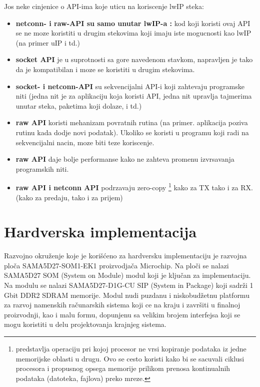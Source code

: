 \documentclass[a4paper,12pt, master]{etf}
\begin{document}
	Jos neke cinjenice o API-ima koje uticu na koriscenje lwIP steka:
	\begin{itemize}
		\item \textbf{netconn- i raw-API su samo unutar lwIP-a :} kod koji koristi ovaj API se 
		ne moze koristiti u drugim stekovima koji imaju iste mogucnosti kao lwIP (na primer 
		uIP i td.)
		\item \textbf{socket API} je u suprotnosti sa gore navedenom stavkom, napravljen je 
		tako da je kompatibilan i moze se koristiti u drugim stekovima.
		\item \textbf{socket- i netconn-API} su sekvencijalni API-i koji zahtevaju programske 
		niti (jedna nit je za aplikaciju koja koristi API, jedna nit upravlja tajmerima unutar 
		steka, paketima koji dolaze, i td.)
		\item \textbf{raw API} koristi mehanizam povratnih rutina (na primer. aplikacija poziva
		rutinu kada dodje novi podatak). Ukoliko se koristi u programu koji radi na 
		sekvencijalni nacin, moze biti teze koriscenje.
		\item \textbf{raw API} daje bolje performanse kako ne zahteva promenu izvrsavanja
		programskih niti.
		\item \textbf{raw API i netconn API} podrzavaju zero-copy \footnote{predstavlja 
		operaciju pri kojoj procesor ne vrsi kopiranje podataka iz jedne memorijske oblasti u 
		drugu. Ovo se cesto koristi kako bi se sacuvali ciklusi procesora i propusnog opsega 
		memorije prilikom prenosa kontinualnih podataka (datoteka, fajlova) preko mreze.} kako 
		za TX tako i za RX.	(kako za predaju, tako i za prijem)
	\end{itemize}

	\newpage

	\chapter{Hardverska implementacija}

	Razvojno okru\v{z}enje koje je kori\v{s}\'{c}eno za hardversku implementaciju je razvojna 
	plo\v{c}a SAMA5D27-SOM1-EK1 proizvodja\v{c}a Microchip. Na plo\v{c}i se nalazi SAMA5D27 
	SOM (System on Module) modul koji je klju\v{c}an za implementaciju. Na modulu se nalazi 
	SAMA5D27-D1G-CU SIP (System in Package) koji sadr\v{z}i 1 Gbit DDR2 SDRAM memorije. Modul 
	nudi puzdanu i niskobud\v{z}etnu platformu	za razvoj namenskih ra\v{c}unarskih sistema 
	koji ce na kraju i zavr\v{s}iti u finalnoj proizvodnji, kao i malu formu, dopunjenu sa 
	velikim brojem interfejsa koji se mogu koristiti u delu projektovanja krajnjeg sistema.
\end{document}
